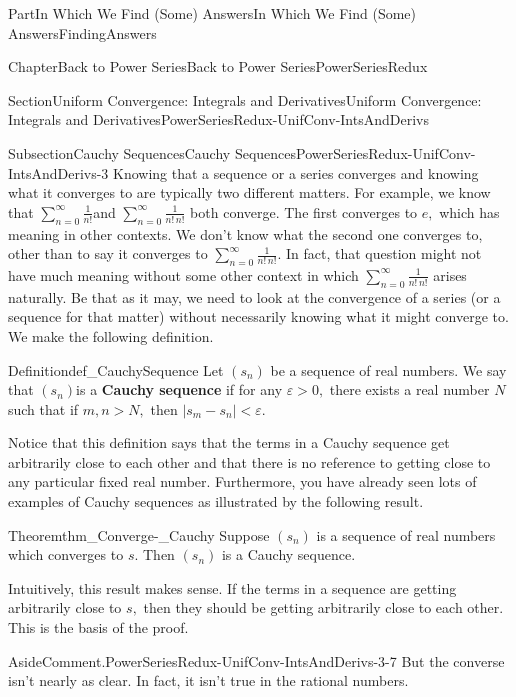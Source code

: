 \documentclass[oneside,10pt,]{book}
\newcommand{\terminology}[1]{\textbf{#1}}
\numberwithin{equation}{part}
\newcommand{\eps}{\varepsilon}
\newcommand{\lt}{<}
\begin{document}
\begin{partptx}{Part}{In Which We Find (Some) Answers}{}{In Which We Find (Some) Answers}{}{}{FindingAnswers}
\begin{chapterptx}{Chapter}{Back to Power Series}{}{Back to Power Series}{}{}{PowerSeriesRedux}
\begin{sectionptx}{Section}{Uniform Convergence: Integrals and Derivatives}{}{Uniform Convergence: Integrals and Derivatives}{}{}{PowerSeriesRedux-UnifConv-IntsAndDerivs}
\begin{introduction}{}
\end{introduction}%
%
%
\typeout{************************************************}
\typeout{************************************************}
%
\begin{subsectionptx}{Subsection}{Cauchy Sequences}{}{Cauchy Sequences}{}{}{PowerSeriesRedux-UnifConv-IntsAndDerivs-3}
Knowing that a sequence or a series converges and knowing what it converges to are typically two different matters.  For example, we know that \(\sum_{n=0}^\infty\frac{1}{n!}\)and \(\sum_{n=0}^\infty\frac{1}{n!\,n!}\) both converge.  The first converges to \(e,\) which has meaning in other contexts.  We don't know what the second one converges to, other than to say it converges to \(\sum_{n=0}^\infty\frac{1}{n!\,n!}\).  In fact, that question might not have much meaning without some other context in which \(\sum_{n=0}^\infty\frac{1}{n!\,n!}\) arises naturally.  Be that as it may, we need to look at the convergence of a series (or a sequence for that matter) without necessarily knowing what it might converge to.  We make the following definition.%
\begin{definition}{Definition}{}{def_CauchySequence}%
 Let \(\left(s_n\right)\) be a sequence of real numbers. We say that \(\left(s_n\right)\)is a \terminology{Cauchy sequence} if for any \(\eps>0,\) there exists a real number \(N\) such that if \(m,n>N,\) then \(|s_m-s_n|\lt \eps\).%
\end{definition}
Notice that this definition says that the terms in a Cauchy sequence get arbitrarily close to each other and that there is no reference to getting close to any particular fixed real number.  Furthermore, you have already seen lots of examples of Cauchy sequences as illustrated by the following result.%
\begin{theorem}{Theorem}{}{}{thm_Converge-_Cauchy}%
 Suppose \(\left(s_n\right)\) is a sequence of real numbers which converges to \(s\).  Then \(\left(s_n\right)\) is a Cauchy sequence.%
\end{theorem}
Intuitively, this result makes sense.  If the terms in a sequence are getting arbitrarily close to \(s,\) then they should be getting arbitrarily close to each other.  This is the basis of the proof.%
\begin{aside}{Aside}{Comment.}{PowerSeriesRedux-UnifConv-IntsAndDerivs-3-7}%
But the converse isn't nearly as clear.  In fact, it isn't true in the rational numbers.%

\end{aside}
\end{subsectionptx}
\end{sectionptx}
\end{chapterptx}
\end{partptx}
\end{document}
